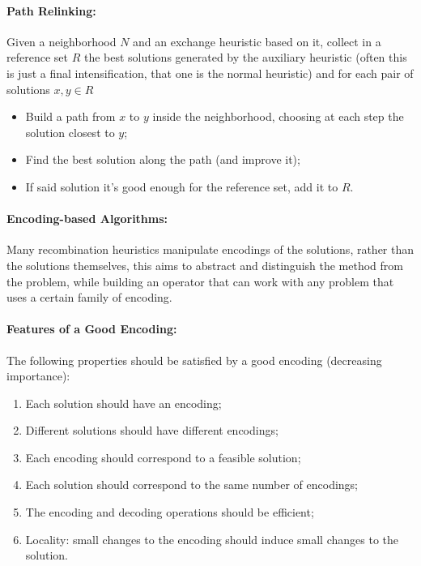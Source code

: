 \documentclass{article}
\begin{document}
	\paragraph{Path Relinking:} Given a neighborhood $N$ and an exchange heuristic based on it, collect in a reference set $R$ the best solutions generated by the auxiliary heuristic (often this is just a final intensification, that one is the normal heuristic) and for each pair of solutions $x,y \in R$
	\begin{itemize}
		\item Build a path from $x$ to $y$ inside the neighborhood, choosing at each step the solution closest to $y$;
		\item Find the best solution along the path (and improve it);
		\item If said solution it's good enough for the reference set, add it to $R$.\\
	\end{itemize}
	
	\paragraph{Encoding-based Algorithms:} Many recombination heuristics manipulate encodings of the solutions, rather than the solutions themselves, this aims to abstract and distinguish the method from the problem, while building an operator that can work with any problem that uses a certain family of encoding.\\
	
	\paragraph{Features of a Good Encoding:} The following properties should be satisfied by a good encoding (decreasing importance):
	\begin{enumerate}
		\item Each solution should have an encoding;
		\item Different solutions should have different encodings;
		\item Each encoding should correspond to a feasible solution;
		\item Each solution should correspond to the same number of encodings;
		\item The encoding and decoding operations should be efficient;
		\item Locality: small changes to the encoding should induce small changes to the solution.\\
	\end{enumerate}
	
\end{document}
